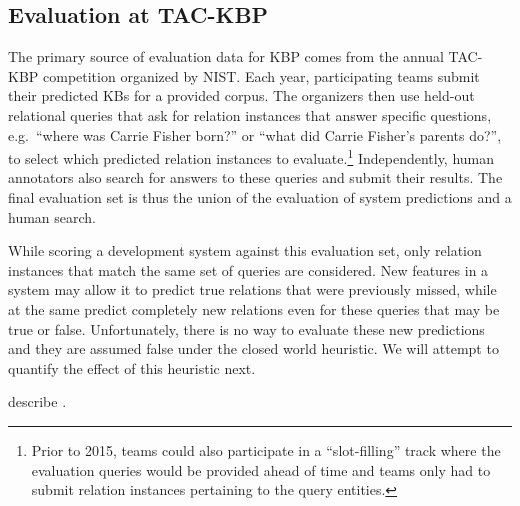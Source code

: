 \subsection{Evaluation at TAC-KBP}

The primary source of evaluation data for KBP comes from the annual TAC-KBP competition organized by NIST.\@ %
Each year, participating teams submit their predicted KBs for a provided corpus.
The organizers then use held-out relational queries that ask for relation instances that answer specific questions, e.g.\ ``where was Carrie Fisher born?'' or ``what did Carrie Fisher's parents do?'', to select which predicted relation instances to evaluate.\footnote{%
  Prior to 2015, teams could also participate in a ``slot-filling'' track where the evaluation queries would be provided ahead of time and teams only had to submit relation instances pertaining to the query entities.}
Independently, human annotators also search for answers to these queries and submit their results.
The final evaluation set is thus the union of the evaluation of system predictions and a human search.

While scoring a development system against this evaluation set, only relation instances that match the same set of queries are considered.
New features in a system may allow it to predict true relations that were previously missed, while at the same predict completely new relations even for these queries that may be true or false.
Unfortunately, there is no way to evaluate these new predictions and they are assumed false under the closed world heuristic.
We will attempt to quantify the effect of this heuristic next.

describe \anydoc.
